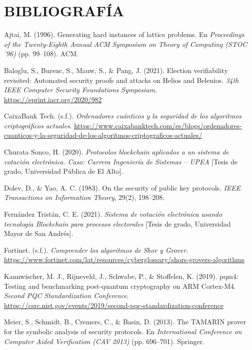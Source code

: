 \section{BIBLIOGRAFÍA}
\begin{flushleft}
	\setlength{\parindent}{0pt}
	\setlength{\parskip}{12pt}
	
	\hangindent=1.25cm
	Ajtai, M. (1996). Generating hard instances of lattice problems. En \textit{Proceedings of the Twenty-Eighth Annual ACM Symposium on Theory of Computing (STOC '96)} (pp. 99--108). ACM.
	
	\hangindent=1.25cm
	Baloglu, S., Bursuc, S., Mauw, S., \& Pang, J. (2021). Election verifiability revisited: Automated security proofs and attacks on Helios and Belenios. \textit{34th IEEE Computer Security Foundations Symposium}. \url{https://eprint.iacr.org/2020/982}
	
	\hangindent=1.25cm
	CaixaBank Tech. (s.f.). \textit{Ordenadores cuánticos y la seguridad de los algoritmos criptográficos actuales}. \url{https://www.caixabanktech.com/es/blogs/ordenadores-cuanticos-y-la-seguridad-de-los-algoritmos-criptograficos-actuales/}
	
	\hangindent=1.25cm
	Churata Sonco, H. (2020). \textit{Protocolos blockchain aplicados a un sistema de votación electrónica. Caso: Carrera Ingeniería de Sistemas -- UPEA} [Tesis de grado, Universidad Pública de El Alto].
	
	\hangindent=1.25cm
	Dolev, D., \& Yao, A. C. (1983). On the security of public key protocols. \textit{IEEE Transactions on Information Theory}, 29(2), 198--208.
	
	\hangindent=1.25cm
	Fernández Tristán, C. E. (2021). \textit{Sistema de votación electrónica usando tecnología Blockchain para procesos electorales} [Tesis de grado, Universidad Mayor de San Andrés].
	
	\hangindent=1.25cm
	Fortinet. (s.f.). \textit{Comprender los algoritmos de Shor y Grover}. \url{https://www.fortinet.com/lat/resources/cyberglossary/shors-grovers-algorithms}
	
	\hangindent=1.25cm
	Kannwischer, M. J., Rijneveld, J., Schwabe, P., \& Stoffelen, K. (2019). pqm4: Testing and benchmarking post-quantum cryptography on ARM Cortex-M4. \textit{Second PQC Standardization Conference}. \url{https://csrc.nist.gov/events/2019/second-pqc-standardization-conference}
	
	\hangindent=1.25cm
	Meier, S., Schmidt, B., Cremers, C., \& Basin, D. (2013). The TAMARIN prover for the symbolic analysis of security protocols. En \textit{International Conference on Computer Aided Verification (CAV 2013)} (pp. 696--701). Springer.
	

\end{flushleft}
